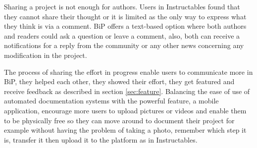 Sharing a project is not enough for authors. Users in Instructables found that they cannot share their thought or it is limited as the only way to express what they think is via a comment. BiP offers a text-based option where both authors and readers could ask a question or leave a comment, also, both can receive a notifications for a reply from the community or any other news concerning any modification in the project.

The process of sharing the effort in progress enable users to communicate more in BiP, they helped each other, they showed their effort, they get featured and receive feedback as described in section \ref{sec:feature}. Balancing the ease of use of automated documentation systems with the powerful feature, a mobile application, encourage more users to upload pictures or videos and enable them to be physically free so they can move around to document their project for example without having the problem of taking a photo, remember which step it is, transfer it then upload it to the platform as in Instructables.


